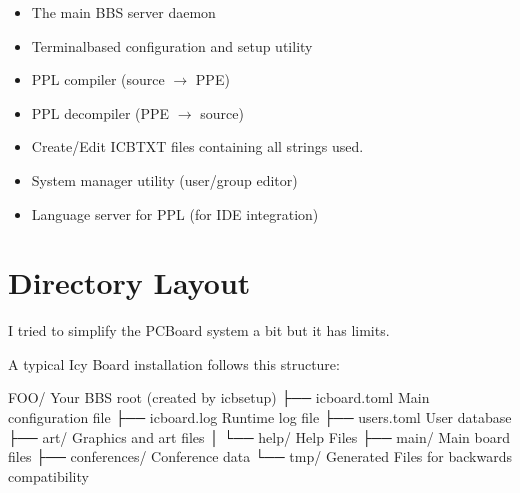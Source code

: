 \documentclass[letterpaper,10pt,english]{sphinxmanual}
\begin{document}
\sphinxAtStartPar
{}
\begin{itemize}
\item {} 
\sphinxAtStartPar
{} \sphinxhyphen{} The main BBS server daemon

\item {} 
\sphinxAtStartPar
{} \sphinxhyphen{} Terminal\sphinxhyphen{}based configuration and setup utility

\item {} 
\sphinxAtStartPar
{} \sphinxhyphen{} PPL compiler (source \(\rightarrow\) PPE)

\item {} 
\sphinxAtStartPar
{} \sphinxhyphen{} PPL decompiler (PPE \(\rightarrow\) source)

\item {} 
\sphinxAtStartPar
{} \sphinxhyphen{} Create/Edit ICBTXT files containing all strings used.

\item {} 
\sphinxAtStartPar
{} \sphinxhyphen{} System manager utility (user/group editor)

\item {} 
\sphinxAtStartPar
{} \sphinxhyphen{} Language server for PPL (for IDE integration)

\end{itemize}


\section{Directory Layout}
\label{\detokenize{index:directory-layout}}
\sphinxAtStartPar
I tried to simplify the PCBoard system a bit but it has limits.

\sphinxAtStartPar
A typical Icy Board installation follows this structure:

\begin{sphinxVerbatim}[commandchars=\\\{\}]
FOO/                    \PYGZsh{} Your BBS root (created by icbsetup)
├── icboard.toml        \PYGZsh{} Main configuration file
├── icboard.log         \PYGZsh{} Runtime log file
├── users.toml          \PYGZsh{} User database
├── art/                \PYGZsh{} Graphics and art files
│   └── help/           \PYGZsh{} Help Files
├── main/               \PYGZsh{} Main board files
├── conferences/        \PYGZsh{} Conference data
└── tmp/                \PYGZsh{} Generated Files for backwards compatibility
\end{sphinxVerbatim}
\end{document}
